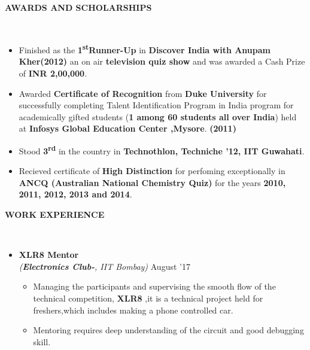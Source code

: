 \documentclass[a4paper,10pt]{article}
\newcommand{\isep}{-2 pt}
\newcommand{\lsep}{-0.5cm}
\newcommand{\resheading}[1]{{\small \colorbox{mygrey}{\begin{minipage}{0.975\textwidth}{\textbf{#1 \vphantom{p\^{E}}}}\end{minipage}}}}
\begin{document}
\resheading{\textbf{AWARDS AND SCHOLARSHIPS} }\\[\lsep]
\begin{itemize}
\setlength\itemsep{0.05em}

\item \noindent Finished as the \textbf{1\textsuperscript{st}Runner-Up} in \textbf{Discover India with Anupam Kher(2012)} an on air \textbf{television quiz show} and was awarded a Cash Prize of \textbf{INR 2,00,000}.

\item \noindent Awarded \textbf{Certificate of Recognition} from \textbf{Duke University} for successfully completing Talent Identification Program in India program for academically gifted students (\textbf{1 among 60 students all over India}) held at \textbf{Infosys Global Education Center ,Mysore}. \textbf{(2011)}

\item \noindent Stood \textbf {3\textsuperscript{rd}} in the country in \textbf {Technothlon, Techniche '12, IIT Guwahati}.

\item Recieved certificate of \textbf {High Distinction} for perfoming exceptionally in \textbf{ANCQ (Australian National Chemistry Quiz)} for the years \textbf{2010, 2011, 2012, 2013 and 2014}.

\end{itemize}

\resheading{\textbf{WORK EXPERIENCE} }\\[\lsep]
\begin{itemize}
\item \textbf{XLR8 Mentor}  \\
 \emph{(\textbf{Electronics Club-},  IIT Bombay)} \hfill August '17\\[-0.6cm]
	\begin{itemize}\itemsep \isep
	\item Managing the participants and supervising the smooth flow of the technical competition, \textbf{XLR8} ,it is a technical project held for freshers,which includes making a phone controlled car.
	\item Mentoring requires deep understanding of the circuit and good debugging skill.
	\end{itemize}


\end{itemize}
\end{document}
